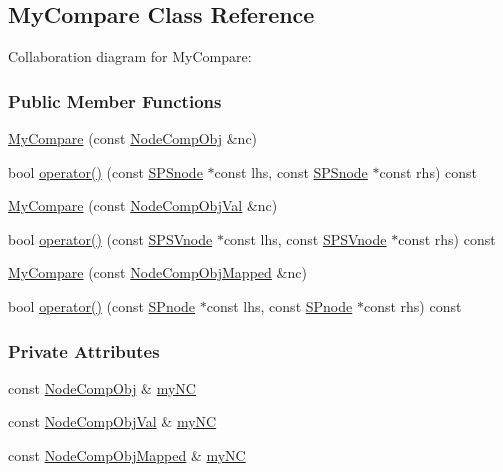 \hypertarget{classMyCompare}{\subsection{\-My\-Compare \-Class \-Reference}
\label{classMyCompare}
}


\-Collaboration diagram for \-My\-Compare\-:
\subsubsection*{\-Public \-Member \-Functions}
\begin{DoxyCompactItemize}
\item 
\hyperlink{classMyCompare_a07bd4f4cbba1f03bce0db9991ceb5e07}{\-My\-Compare} (const \hyperlink{classsubpavings_1_1NodeCompObj}{\-Node\-Comp\-Obj} \&nc)
\item 
bool \hyperlink{classMyCompare_ab8e83151fa901c20449290ba5e8fb735}{operator()} (const \hyperlink{classsubpavings_1_1SPSnode}{\-S\-P\-Snode} $\ast$const lhs, const \hyperlink{classsubpavings_1_1SPSnode}{\-S\-P\-Snode} $\ast$const rhs) const 
\item 
\hyperlink{classMyCompare_a404a0d135af697d1e77f095a5f178c50}{\-My\-Compare} (const \hyperlink{classsubpavings_1_1NodeCompObjVal}{\-Node\-Comp\-Obj\-Val} \&nc)
\item 
bool \hyperlink{classMyCompare_a9af5853229809316e3499b8be21a607e}{operator()} (const \hyperlink{classsubpavings_1_1SPSVnode}{\-S\-P\-S\-Vnode} $\ast$const lhs, const \hyperlink{classsubpavings_1_1SPSVnode}{\-S\-P\-S\-Vnode} $\ast$const rhs) const 
\item 
\hyperlink{classMyCompare_adeb357f13bed7aa77885efe212b65fbf}{\-My\-Compare} (const \hyperlink{classsubpavings_1_1NodeCompObjMapped}{\-Node\-Comp\-Obj\-Mapped} \&nc)
\item 
bool \hyperlink{classMyCompare_acefac57f95bf5fa66ac62fa08d82e72b}{operator()} (const \hyperlink{classsubpavings_1_1SPnode}{\-S\-Pnode} $\ast$const lhs, const \hyperlink{classsubpavings_1_1SPnode}{\-S\-Pnode} $\ast$const rhs) const 
\end{DoxyCompactItemize}
\subsubsection*{\-Private \-Attributes}
\begin{DoxyCompactItemize}
\item 
const \hyperlink{classsubpavings_1_1NodeCompObj}{\-Node\-Comp\-Obj} \& \hyperlink{classMyCompare_af0e29031d7490821548f19f8f993b297}{my\-N\-C}
\item 
const \hyperlink{classsubpavings_1_1NodeCompObjVal}{\-Node\-Comp\-Obj\-Val} \& \hyperlink{classMyCompare_aad6bdf9b44e3fbc16faaf3368b764515}{my\-N\-C}
\item 
const \hyperlink{classsubpavings_1_1NodeCompObjMapped}{\-Node\-Comp\-Obj\-Mapped} \& \hyperlink{classMyCompare_aa9f27ea198651dc3a8f2b3aaedc3b2ae}{my\-N\-C}
\end{DoxyCompactItemize}


